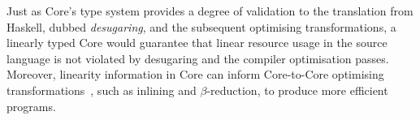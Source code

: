\documentclass[acmsmall,review,screen]{acmart}
\begin{document}

Just as Core's type system \cite{10.1145/1190315.1190324} provides a degree of validation to the
translation from Haskell, dubbed \emph{desugaring}, and the subsequent
optimising transformations, a linearly typed Core would guarantee that
linear resource usage in the source language is not violated by desugaring
and the compiler optimisation passes. Moreover, linearity information in
Core can inform Core-to-Core optimising 
transformations~\cite{cite:let-floating,peytonjones1997a,cite:linearhaskell},
such as inlining and $\beta$-reduction, to produce more efficient programs.
%
%
%
%
\end{document}
